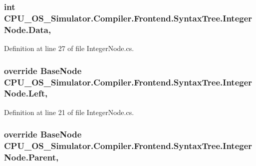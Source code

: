 \subsubsection[{Data}]{\setlength{\rightskip}{0pt plus 5cm}int C\+P\+U\+\_\+\+O\+S\+\_\+\+Simulator.\+Compiler.\+Frontend.\+Syntax\+Tree.\+Integer\+Node.\+Data\hspace{0.3cm}{\ttfamily [get]}, {\ttfamily [set]}}\label{class_c_p_u___o_s___simulator_1_1_compiler_1_1_frontend_1_1_syntax_tree_1_1_integer_node_aa6c8b3f7e01b8aefb784de1a42036071}


Definition at line 27 of file Integer\+Node.\+cs.

\hypertarget{class_c_p_u___o_s___simulator_1_1_compiler_1_1_frontend_1_1_syntax_tree_1_1_integer_node_a49b63ddefa5ac8505ced0be5d9f7e09d}{}
\subsubsection[{Left}]{\setlength{\rightskip}{0pt plus 5cm}override {\bf Base\+Node} C\+P\+U\+\_\+\+O\+S\+\_\+\+Simulator.\+Compiler.\+Frontend.\+Syntax\+Tree.\+Integer\+Node.\+Left\hspace{0.3cm}{\ttfamily [get]}, {\ttfamily [set]}}\label{class_c_p_u___o_s___simulator_1_1_compiler_1_1_frontend_1_1_syntax_tree_1_1_integer_node_a49b63ddefa5ac8505ced0be5d9f7e09d}


Definition at line 21 of file Integer\+Node.\+cs.

\hypertarget{class_c_p_u___o_s___simulator_1_1_compiler_1_1_frontend_1_1_syntax_tree_1_1_integer_node_a592ddb201c5e069e7a195e79c7feecce}{}
\subsubsection[{Parent}]{\setlength{\rightskip}{0pt plus 5cm}override {\bf Base\+Node} C\+P\+U\+\_\+\+O\+S\+\_\+\+Simulator.\+Compiler.\+Frontend.\+Syntax\+Tree.\+Integer\+Node.\+Parent\hspace{0.3cm}{\ttfamily [get]}, {\ttfamily [set]}}\label{class_c_p_u___o_s___simulator_1_1_compiler_1_1_frontend_1_1_syntax_tree_1_1_integer_node_a592ddb201c5e069e7a195e79c7feecce}


